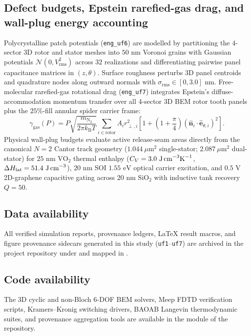 \documentclass[11pt,a4paper]{article}
\begin{document}
\subsection*{Defect budgets, Epstein rarefied-gas drag, and wall-plug energy accounting}
Polycrystalline patch potentials (\texttt{eng\_uf6}) are modelled by partitioning the 4-sector 3D rotor and stator meshes into $50\text{ nm}$ Voronoi grains with Gaussian potentials $\mathcal{N}(0,V_{\mathrm{rms}}^2)$ across $32$ realizations and differentiating pairwise panel capacitance matrices in $(z,\theta)$. Surface roughness perturbs 3D panel centroids and quadrature nodes along outward normals with $\sigma_{\mathrm{rms}} \in [0, 3.0]\text{ nm}$. Free-molecular rarefied-gas rotational drag (\texttt{eng\_uf7}) integrates Epstein's diffuse-accommodation momentum transfer\cite{epstein1924} over all 4-sector 3D BEM rotor tooth panels plus the $25\%$-fill annular spider carrier frame:
\begin{equation}
\gamma_{\mathrm{gas}}(P) = P\sqrt{\frac{m_{\mathrm{N}_2}}{2\pi k_{\mathrm{B}} T}}\sum_{i\in\mathrm{rotor}} A_i r_{\perp,i}^2\left[1 + \left(1 + \frac{\pi}{4}\right)(\hat{\mathbf{n}}_i\cdot\hat{\mathbf{e}}_{\theta,i})^2\right].
\label{eq:epstein_methods}
\end{equation}
Physical wall-plug budgets evaluate active release-seam areas directly from the canonical $N=2$ Cantor track geometry ($1.044\ \mu\text{m}^2$ single-stator; $2.087\ \mu\text{m}^2$ dual-stator) for $25\text{ nm}$ $\mathrm{VO}_2$ thermal enthalpy ($C_V = 3.0\text{ J\,cm}^{-3}\text{K}^{-1}$, $\Delta H_{\mathrm{lat}} = 51.4\text{ J\,cm}^{-3}$)\cite{berglund1969}, $20\text{ nm}$ SOI $1.55\text{ eV}$ optical carrier excitation, and $0.5\text{ V}$ 2D-graphene capacitive gating across $20\text{ nm}$ $\mathrm{SiO}_2$ with inductive tank recovery $Q=50$.

\subsection*{Data availability}
All verified simulation reports, provenance ledgers, LaTeX result macros, and figure provenance sidecars generated in this study (\texttt{uf1}--\texttt{uf7}) are archived in the project repository under  and mapped in .

\subsection*{Code availability}
The 3D cyclic and non-Bloch 6-DOF BEM solvers, Meep FDTD verification scripts, Kramers--Kronig switching drivers, BAOAB Langevin thermodynamic suites, and provenance aggregation tools are available in the  module of the repository.
\end{document}
